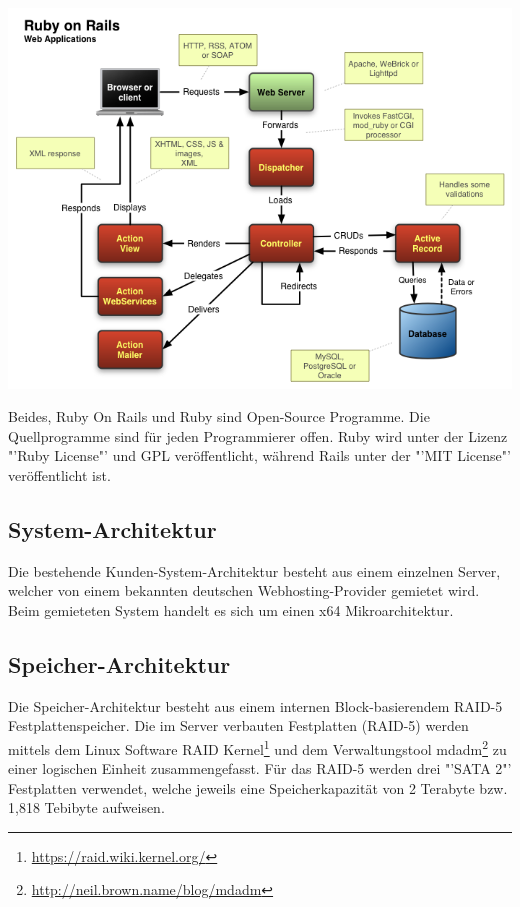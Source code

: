 \begin{center}
\includegraphics[width=\linewidth, keepaspectratio = true]{media/rails-architecture.png}
\end{center}

Beides, Ruby On Rails und Ruby sind Open-Source Programme. Die Quellprogramme sind für jeden Programmierer offen. Ruby wird unter der Lizenz "'Ruby License"' und GPL veröffentlicht, während Rails unter der "'MIT License"' veröffentlicht ist.

\subsection{System-Architektur}\label{System-Architektur}
Die bestehende Kunden-System-Architektur besteht aus einem einzelnen Server, welcher von einem bekannten deutschen Webhosting-Provider gemietet wird. Beim gemieteten System handelt es sich um einen x64 Mikroarchitektur.

\subsection{Speicher-Architektur}
Die Speicher-Architektur besteht aus einem internen Block-basierendem RAID-5 Festplattenspeicher. Die im Server verbauten Festplatten (RAID-5) werden mittels dem Linux Software RAID Kernel\footnote{\url{https://raid.wiki.kernel.org/}} und dem Verwaltungstool mdadm\footnote{\url{http://neil.brown.name/blog/mdadm}} zu einer logischen Einheit zusammengefasst. Für das RAID-5 werden drei "'SATA 2"' Festplatten verwendet, welche jeweils eine Speicherkapazität von 2 Terabyte bzw. 1,818 Tebibyte aufweisen.

